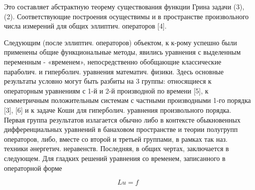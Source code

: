 \documentclass[10pt]{article}
\begin{document}
Это составляет абстрактную теорему существования функции Грина задачи (3), (2). Соответствующие построения осуществимы и в пространстве произвольного числа измерений для общих эллиптич. операторов [4].



Следующим (после эллиптич. операторов) объектом, к к-рому успешно были применены общие функциональные методы, явились уравнения с выделенным переменным - «временем», непосредственно обобщающие классические параболич. и гиперболич. уравнения математич. физики. Здесь основные результаты условно могут быть разбиты на 3 группы: относящиеся к операторным уравнениям с 1-й и 2-й производной по времени [5], к симметричным положительным системам с частными производными 1-го порядка [3], [6] и к задаче Коши для гиперболич. уравнения произвольного порядка. Первая группа результатов излагается обычно либо в контексте обыкновенных дифференциальных уравнений в банаховом пространстве и теории полугрупп операторов, либо, вместе со второй и третьей группами, в рамках так наз. техники әнергетич. неравенств. Последняя, в общих чертах, заключается в следующем. Для гладких решений уравнения со временем, записанного в операторной форме



\[

L u=f

\]
\end{document}
